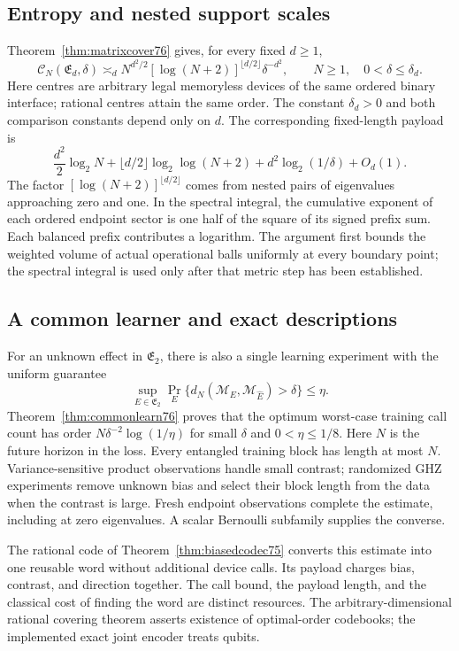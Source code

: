 \subsection{Entropy and nested support scales}
Theorem~\ref{thm:matrixcover76} gives, for every fixed $d\ge1$,
\[
 \mathcal C_N(\mathfrak E_d,\delta)
 \asymp_d
 N^{d^2/2}[\log(N+2)]^{\lfloor d/2\rfloor}\delta^{-d^2},
 \qquad N\ge1,\quad0<\delta\le\delta_d.
\]
Here centres are arbitrary legal memoryless devices of the same
ordered binary interface; rational centres attain the same order.
The constant $\delta_d>0$ and both comparison constants depend only
on $d$. The corresponding fixed-length payload is
\[
 \frac{d^2}{2}\log_2N+\lfloor d/2\rfloor\log_2\log(N+2)
                +d^2\log_2(1/\delta)+O_d(1).
\]
The factor $[\log(N+2)]^{\lfloor d/2\rfloor}$ comes from nested
pairs of eigenvalues approaching zero and one. In the spectral
integral, the cumulative exponent of each ordered endpoint sector
is one half of the square of its signed prefix sum. Each balanced
prefix contributes a logarithm. The argument first bounds the
weighted volume of actual operational balls uniformly at every
boundary point; the spectral integral is used only after that
metric step has been established.

\subsection{A common learner and exact descriptions}
For an unknown effect in $\mathfrak E_2$, there is also a single
learning experiment with the uniform guarantee
\[
 \sup_{E\in\mathfrak E_2}
 \Pr_E\{d_N(\mathcal M_E,\mathcal M_{\widehat E})>\delta\}
 \le\eta.
\]
Theorem~\ref{thm:commonlearn76} proves that the optimum worst-case
training call count has order
$N\delta^{-2}\log(1/\eta)$ for small $\delta$ and
$0<\eta\le1/8$. Here $N$ is the future horizon in the loss.
Every entangled training block has length at most $N$.
Variance-sensitive product observations handle small contrast;
randomized GHZ experiments remove unknown bias and select their
block length from the data when the contrast is large. Fresh
endpoint observations complete the estimate, including at zero
eigenvalues. A scalar Bernoulli subfamily supplies the converse.

The rational code of Theorem~\ref{thm:biasedcodec75} converts this
estimate into one reusable word without additional device calls.
Its payload charges bias, contrast, and direction together. The
call bound, the payload length, and the classical cost of finding
the word are distinct resources. The arbitrary-dimensional
rational covering theorem asserts existence of optimal-order
codebooks; the implemented exact joint encoder treats qubits.

